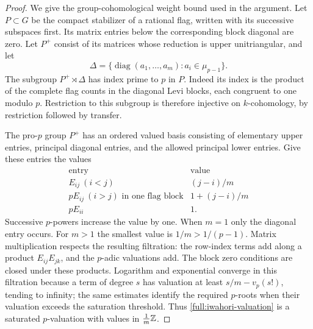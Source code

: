 \begin{proof}
We give the group-cohomological weight bound used in the argument.
Let $P\subset G$ be the compact stabilizer of a rational flag,
written with its successive subspaces first.  Its matrix entries
below the corresponding block diagonal are zero.
Let $P^+$ consist of its matrices whose reduction is upper
unitriangular, and let
\[
 \Delta=\{\operatorname{diag}(a_1,\ldots,a_m):
                      a_i\in\mu_{p-1}\}.
\]
The subgroup $P^+\rtimes\Delta$ has index prime to $p$ in $P$.
Indeed its index is the product of the complete flag counts in
the diagonal Levi blocks, each congruent to one modulo $p$.
Restriction to this subgroup is therefore injective on
$k$-cohomology, by restriction followed by transfer.

The pro-$p$ group $P^+$ has an ordered valued basis consisting
of elementary upper entries, principal diagonal entries, and
the allowed principal lower entries.  Give these entries the
values
\begin{equation}
\label{full:iwahori-valuation}
 \begin{array}{c|c}
  \text{entry}&\text{value}\\ \hline
  E_{ij}\ (i<j)&(j-i)/m\\
  pE_{ij}\ (i>j)\text{ in one flag block}
                    &1+(j-i)/m\\
  pE_{ii}&1 .
 \end{array}
\end{equation}
Successive $p$-powers increase the value by one.
When $m=1$ only the diagonal entry occurs.
For $m>1$ the smallest value is $1/m>1/(p-1)$.
Matrix multiplication respects the resulting filtration:
the row-index terms add along a product $E_{ij}E_{jk}$, and
the $p$-adic valuations add.  The block zero conditions are
closed under these products.  Logarithm and exponential
converge in this filtration because a term of degree $s$
has valuation at least $s/m-v_p(s!)$, tending to infinity;
the same estimates identify the required $p$-roots when their
valuation exceeds the saturation threshold.  Thus
\eqref{full:iwahori-valuation} is a saturated $p$-valuation
with values in $\frac1m\mathbb Z$.


\end{proof}
